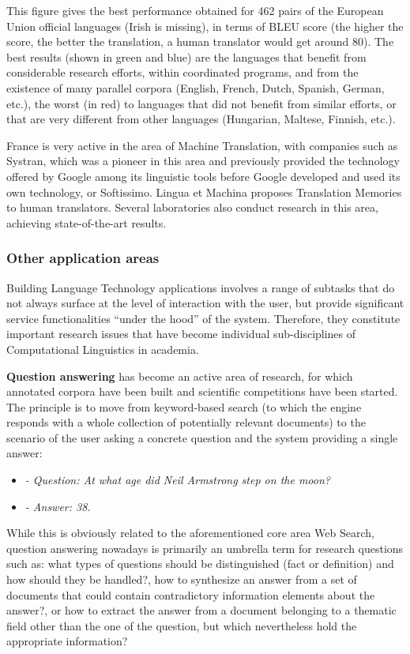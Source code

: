 \begin{multicols}{2}
This figure gives the best performance obtained for 462 pairs of the
European Union official languages (Irish is missing), in terms of BLEU
score (the higher the score, the better the translation, a human
translator would get around 80). The best results (shown in green and
blue) are the languages that benefit from considerable research
efforts, within coordinated programs, and from the existence of many
parallel corpora (English, French, Dutch, Spanish, German, etc.), the
worst (in red) to languages that did not benefit from similar efforts,
or that are very different from other languages (Hungarian, Maltese,
Finnish, etc.).

France is very active in the area of Machine Translation, with
companies such as Systran, which was a pioneer in this area and
previously provided the technology offered by Google among its
linguistic tools before Google developed and used its own technology,
or Softissimo. Lingua et Machina proposes Translation Memories to
human translators. Several laboratories also conduct research in this
area, achieving state-of-the-art results.

\subsubsection{Other application areas}

Building Language Technology applications involves a range of subtasks
that do not always surface at the level of interaction with the user,
but provide significant service functionalities ``under the hood'' of
the system. Therefore, they constitute important research issues that
have become individual sub-disciplines of Computational Linguistics in
academia.

{\bf Question answering} has become an active area of research, for
which annotated corpora have been built and scientific competitions
have been started. The principle is to move from keyword-based search
(to which the engine responds with a whole collection of potentially
relevant documents) to the scenario of the user asking a concrete
question and the system providing a single answer:

\begin{itemize}
\item[] \textit{- Question: At what age did Neil Armstrong step on the moon?}
\item[] \textit{- Answer: 38.}
\end{itemize}

While this is obviously related to the aforementioned core area
Web Search, question answering nowadays is primarily an umbrella term
for research questions such as: what types of questions should be
distinguished (fact or definition) and how should they be handled?, how
to synthesize an answer from a set of documents that could contain
contradictory information elements about the answer?, or how to extract
the answer from a document belonging to a thematic field other than
the one of the question, but which nevertheless hold the appropriate
information?


\end{multicols}
